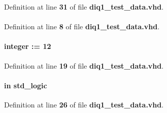 Definition at line {\bf 31} of file {\bf diq1\+\_\+test\+\_\+data.\+vhd}.

\paragraph[{ieee}]{\hspace{0.3cm}{\ttfamily [Library]}}\label{classdiq1__test__data_a0a6af6eef40212dbaf130d57ce711256}


Definition at line {\bf 8} of file {\bf diq1\+\_\+test\+\_\+data.\+vhd}.

\paragraph[{iq\+\_\+width}]{ {\bfseries \textcolor{vhdlchar}{ }} {\bfseries \textcolor{comment}{integer}\textcolor{vhdlchar}{ }\textcolor{vhdlchar}{ }\textcolor{vhdlchar}{\+:}\textcolor{vhdlchar}{=}\textcolor{vhdlchar}{ }\textcolor{vhdlchar}{ } \textcolor{vhdldigit}{12} \textcolor{vhdlchar}{ }} \hspace{0.3cm}{\ttfamily [Generic]}}\label{classdiq1__test__data_ad9eb9b875b008b241e3b7e7c8ff4b62a}


Definition at line {\bf 19} of file {\bf diq1\+\_\+test\+\_\+data.\+vhd}.

\paragraph[{mimo\+\_\+en}]{ {\bfseries \textcolor{keywordflow}{in}\textcolor{vhdlchar}{ }} {\bfseries \textcolor{comment}{std\+\_\+logic}\textcolor{vhdlchar}{ }} \hspace{0.3cm}{\ttfamily [Port]}}\label{classdiq1__test__data_a0c57670aee4f9fbfa3c286573012965a}


Definition at line {\bf 26} of file {\bf diq1\+\_\+test\+\_\+data.\+vhd}.

